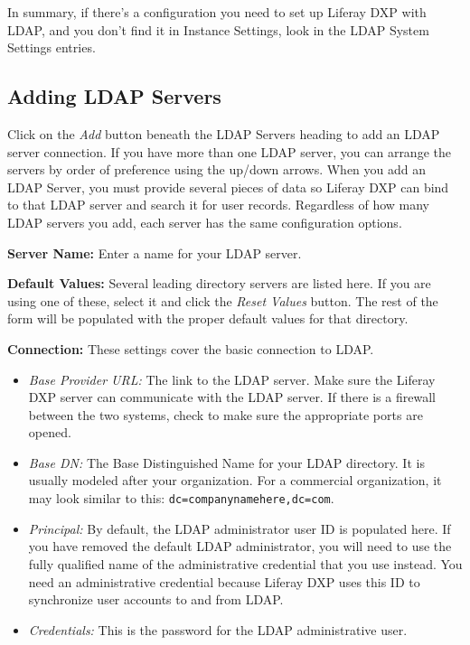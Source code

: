 \noindent\hrulefill

In summary, if there's a configuration you need to set up Liferay DXP
with LDAP, and you don't find it in Instance Settings, look in the LDAP
System Settings entries.

\subsection{Adding LDAP Servers}\label{adding-ldap-servers}

Click on the \emph{Add} button beneath the LDAP Servers heading to add
an LDAP server connection. If you have more than one LDAP server, you
can arrange the servers by order of preference using the up/down arrows.
When you add an LDAP Server, you must provide several pieces of data so
Liferay DXP can bind to that LDAP server and search it for user records.
Regardless of how many LDAP servers you add, each server has the same
configuration options.

\textbf{Server Name:} Enter a name for your LDAP server.

\textbf{Default Values:} Several leading directory servers are listed
here. If you are using one of these, select it and click the \emph{Reset
Values} button. The rest of the form will be populated with the proper
default values for that directory.

\textbf{Connection:} These settings cover the basic connection to LDAP.

\begin{itemize}
\item
  \emph{Base Provider URL:} The link to the LDAP server. Make sure the
  Liferay DXP server can communicate with the LDAP server. If there is a
  firewall between the two systems, check to make sure the appropriate
  ports are opened.
\item
  \emph{Base DN:} The Base Distinguished Name for your LDAP directory.
  It is usually modeled after your organization. For a commercial
  organization, it may look similar to this:
  \texttt{dc=companynamehere,dc=com}.
\item
  \emph{Principal:} By default, the LDAP administrator user ID is
  populated here. If you have removed the default LDAP administrator,
  you will need to use the fully qualified name of the administrative
  credential that you use instead. You need an administrative credential
  because Liferay DXP uses this ID to synchronize user accounts to and
  from LDAP.
\item
  \emph{Credentials:} This is the password for the LDAP administrative
  user.
\end{itemize}

